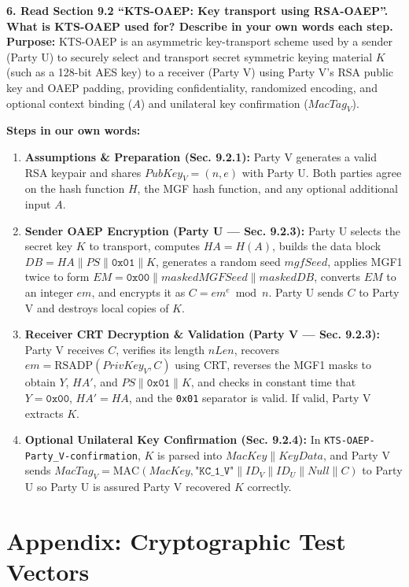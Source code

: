 \documentclass[10pt,twocolumn,letterpaper]{article}
\begin{document}
\vspace{0.5em}
\noindent\textbf{6. Read Section 9.2 ``KTS-OAEP: Key transport using RSA-OAEP''. What is KTS-OAEP used for? Describe in your own words each step.} \\
\textbf{Purpose:} KTS-OAEP is an asymmetric key-transport scheme used by a sender (Party U) to securely select and transport secret symmetric keying material $K$ (such as a 128-bit AES key) to a receiver (Party V) using Party V's RSA public key and OAEP padding, providing confidentiality, randomized encoding, and optional context binding ($A$) and unilateral key confirmation ($MacTag_V$).

\noindent\textbf{Steps in our own words:}
\begin{enumerate}
    \item \textbf{Assumptions \& Preparation (Sec. 9.2.1):} Party V generates a valid RSA keypair and shares $PubKey_V = (n, e)$ with Party U. Both parties agree on the hash function $H$, the MGF hash function, and any optional additional input $A$.
    \item \textbf{Sender OAEP Encryption (Party U --- Sec. 9.2.3):} Party U selects the secret key $K$ to transport, computes $HA = H(A)$, builds the data block $DB = HA \parallel PS \parallel \texttt{0x01} \parallel K$, generates a random seed $mgfSeed$, applies MGF1 twice to form $EM = \texttt{0x00} \parallel maskedMGFSeed \parallel maskedDB$, converts $EM$ to an integer $em$, and encrypts it as $C = em^e \bmod n$. Party U sends $C$ to Party V and destroys local copies of $K$.
    \item \textbf{Receiver CRT Decryption \& Validation (Party V --- Sec. 9.2.3):} Party V receives $C$, verifies its length $nLen$, recovers $em = \text{RSADP}(PrivKey_V, C)$ using CRT, reverses the MGF1 masks to obtain $Y$, $HA'$, and $PS \parallel \texttt{0x01} \parallel K$, and checks in constant time that $Y = \texttt{0x00}$, $HA' = HA$, and the \texttt{0x01} separator is valid. If valid, Party V extracts $K$.
    \item \textbf{Optional Unilateral Key Confirmation (Sec. 9.2.4):} In \texttt{KTS-OAEP-Party\_V-confirmation}, $K$ is parsed into $MacKey \parallel KeyData$, and Party V sends $MacTag_V = \text{MAC}(MacKey, \texttt{"KC\_1\_V"} \parallel ID_V \parallel ID_U \parallel Null \parallel C)$ to Party U so Party U is assured Party V recovered $K$ correctly.
\end{enumerate}

\section{Appendix: Cryptographic Test Vectors}
\end{document}
